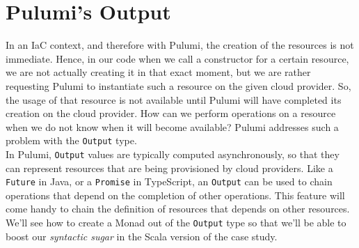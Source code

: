 \section{Pulumi's Output}
In an IaC context, and therefore with Pulumi, the creation of the resources is not immediate.
Hence, in our code when we call a constructor for a certain resource, we are not actually creating it in that exact moment, but we are rather requesting Pulumi to instantiate such a resource on the given cloud provider.
So, the usage of that resource is not available until Pulumi will have completed its creation on the cloud provider.
How can we perform operations on a resource when we do not know when it will become available?
Pulumi addresses such a problem with the \texttt{Output} type.\\
In Pulumi, \texttt{Output} values are typically computed asynchronously, so that they can represent resources that are being provisioned by cloud providers.
Like a \texttt{Future} in Java, or a \texttt{Promise} in TypeScript, an \texttt{Output} can be used to chain operations that depend on the completion of other operations.
This feature will come handy to chain the definition of resources that depends on other resources.\\
We'll see how to create a Monad out of the \texttt{Output} type so that we'll be able to boost our \textit{syntactic sugar} in the Scala version of the case study.
